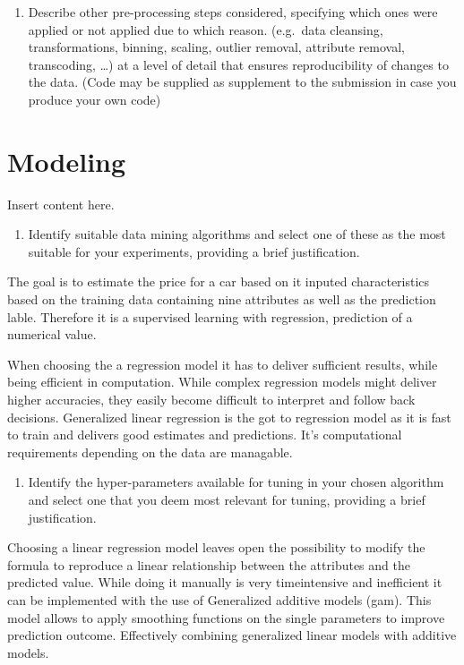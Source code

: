 \documentclass[sigchi]{acmart}
\def\tightlist{}
\begin{document}
\begin{enumerate}
\def\labelenumi{\alph{enumi}.}
\setcounter{enumi}{2}
\tightlist
\item
  Describe other pre-processing steps considered, specifying which ones were applied or not applied due to which reason. (e.g.~data cleansing, transformations, binning, scaling, outlier removal, attribute removal, transcoding, \ldots{}) at a level of detail that ensures reproducibility of changes to the data. (Code may be supplied as supplement to the submission in case you produce your own code)
\end{enumerate}

\hypertarget{modeling}{%
\section{Modeling}\label{modeling}}

Insert content here.

\begin{enumerate}
\def\labelenumi{\alph{enumi}.}
\tightlist
\item
  Identify suitable data mining algorithms and select one of these as the most suitable for your experiments, providing a brief justification.
\end{enumerate}

The goal is to estimate the price for a car based on it inputed characteristics based on the training data containing nine attributes as well as the prediction lable. Therefore it is a supervised learning with regression, prediction of a numerical value.

When choosing the a regression model it has to deliver sufficient results, while being efficient in computation.
While complex regression models might deliver higher accuracies, they easily become difficult to interpret and follow back decisions.
Generalized linear regression is the got to regression model as it is fast to train and delivers good estimates and predictions. It's computational requirements depending on the data are managable.

\begin{enumerate}
\def\labelenumi{\alph{enumi}.}
\setcounter{enumi}{1}
\tightlist
\item
  Identify the hyper-parameters available for tuning in your chosen algorithm and select one that you deem most relevant for tuning, providing a brief justification.
\end{enumerate}

Choosing a linear regression model leaves open the possibility to modify the formula to reproduce a linear relationship between the attributes and the predicted value. While doing it manually is very timeintensive and inefficient it can be implemented with the use of Generalized additive models (gam). This model allows to apply smoothing functions on the single parameters to improve prediction outcome. Effectively combining generalized linear models with additive models.
\end{document}
